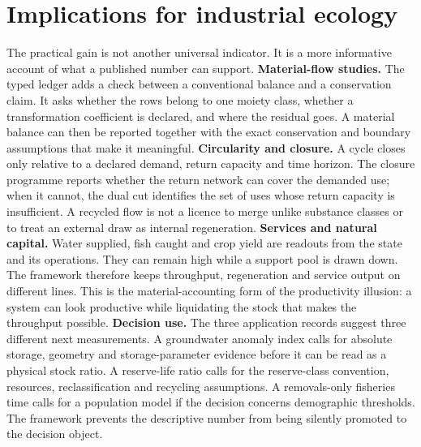 \documentclass[11pt]{article}
\begin{document}
\section{Implications for industrial ecology}
The practical gain is not another universal indicator. It is a more informative account of what a published number can support.
\textbf{Material-flow studies.} The typed ledger adds a check between a conventional balance and a conservation claim. It asks whether the rows belong to one moiety class, whether a transformation coefficient is declared, and where the residual goes. A material balance can then be reported together with the exact conservation and boundary assumptions that make it meaningful.
\textbf{Circularity and closure.} A cycle closes only relative to a declared demand, return capacity and time horizon. The closure programme reports whether the return network can cover the demanded use; when it cannot, the dual cut identifies the set of uses whose return capacity is insufficient. A recycled flow is not a licence to merge unlike substance classes or to treat an external draw as internal regeneration.
\textbf{Services and natural capital.} Water supplied, fish caught and crop yield are readouts from the state and its operations. They can remain high while a support pool is drawn down. The framework therefore keeps throughput, regeneration and service output on different lines. This is the material-accounting form of the productivity illusion: a system can look productive while liquidating the stock that makes the throughput possible.
\textbf{Decision use.} The three application records suggest three different next measurements. A groundwater anomaly index calls for absolute storage, geometry and storage-parameter evidence before it can be read as a physical stock ratio. A reserve-life ratio calls for the reserve-class convention, resources, reclassification and recycling assumptions. A removals-only fisheries time calls for a population model if the decision concerns demographic thresholds. The framework prevents the descriptive number from being silently promoted to the decision object.
\end{document}
